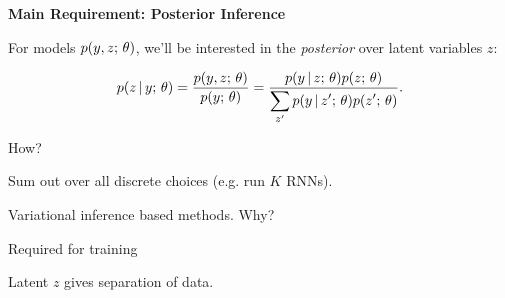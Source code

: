 \documentclass[aspectratio=169]{beamer}
\let\tempone\itemize
\let\temptwo\enditemize
\renewenvironment{itemize}{\tempone\addtolength{\itemsep}{0.5\baselineskip}}{\temptwo}
\newcommand{\thetitle}[1]{{\begin{center}\textbf{{#1}}\end{center}}}
\newcommand{\air}{\vspace{0.25cm}}
\begin{document}





\begin{frame}\thetitle{Main Requirement: Posterior Inference}
    For models $p(y, z ; \, \theta)$, we'll be interested in the \textit{posterior} over latent variables $z$:

    \begin{align*}
        p(z \,|\, y ; \, \theta) = \frac{\displaystyle p(y, z ; \, \theta)}{\displaystyle p(y ; \, \theta)} = \frac{\displaystyle p(y\,|\, z ; \,  \theta) p(z ; \,  \theta)}{\displaystyle \sum_{z'} p(y \,|\, z'; \,  \theta) p(z'; \,  \theta) }.
    \end{align*}

    \air





    How?

    \begin{itemize}
    \item Sum out over all discrete choices (e.g. run $K$ RNNs).
    \item Variational inference based methods.
    \end{itemize}
    Why?
    \begin{itemize}
      \item Required for training
      \item Latent $z$ gives separation of data.
    \end{itemize}
\end{frame}
\end{document}
